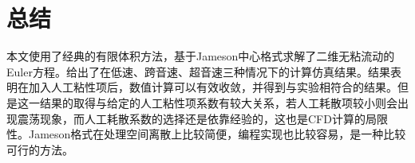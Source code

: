 \documentclass[UTF8]{ctexart}
\begin{document}
\section{总结}
本文使用了经典的有限体积方法，基于Jameson中心格式求解了二维无粘流动的Euler方程。给出了在低速、跨音速、超音速三种情况下的计算仿真结果。结果表明在加入人工粘性项后，数值计算可以有效收敛，并得到与实验相符合的结果。但是这一结果的取得与给定的人工粘性项系数有较大关系，若人工耗散项较小则会出现震荡现象，而人工耗散系数的选择还是依靠经验的，这也是CFD计算的局限性。Jameson格式在处理空间离散上比较简便，编程实现也比较容易，是一种比较可行的方法。
\end{document}
